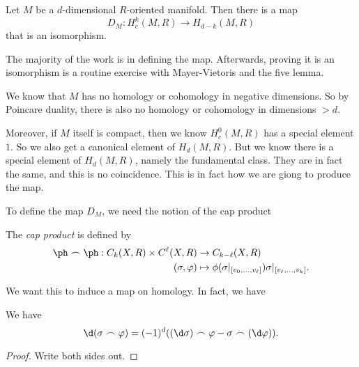 \documentclass[a4paper]{article}
\begin{document}
\begin{thm}
  Let $M$ be a $d$-dimensional $R$-oriented manifold. Then there is a map
  \[
    D_M: H^k_c(M, R) \to H_{d - k}(M, R)
  \]
  that is an isomorphism.
\end{thm}
The majority of the work is in defining the map. Afterwards, proving it is an isomorphism is a routine exercise with Mayer-Vietoris and the five lemma.

We know that $M$ has no homology or cohomology in negative dimensions. So by Poincare duality, there is also no homology or cohomology in dimensions $> d$.

Moreover, if $M$ itself is compact, then we know $H^0_c(M, R)$ has a special element $1$. So we also get a canonical element of $H_d(M, R)$. But we know there is a special element of $H_d(M, R)$, namely the fundamental class. They are in fact the same, and this is no coincidence. This is in fact how we are giong to produce the map.

To define the map $D_M$, we need the notion of the cap product
\begin{defi}
  The \emph{cap product} is defined by
  \begin{align*}
    \ph \frown \ph : C_k(X, R) \times C^\ell(X, R) &\to C_{k - \ell} (X, R)\\
    (\sigma, \varphi) &\mapsto \phi(\sigma|_{[v_0, \ldots, v_\ell]}) \sigma|_{[v_{\ell}, \ldots, v_k]}.
  \end{align*}
\end{defi}
We want this to induce a map on homology. In fact, we have
\begin{lemma}
  We have
  \[
    \d(\sigma \frown \varphi) = (-1)^d ((\d \sigma) \frown \varphi - \sigma \frown (\d \varphi)).
  \]
\end{lemma}

\begin{proof}
  Write both sides out.
\end{proof}
\end{document}
